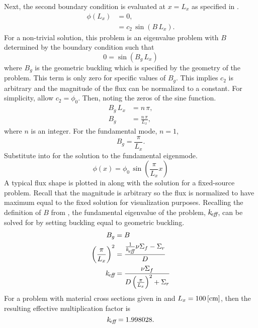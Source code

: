   Next, the second boundary condition is evaluated at $x=L_x$ as specified in
  .
  \begin{align}
    \phi(L_x) &= 0 ,\\
    &= c_2 \, \sin(B \, L_x).
  \end{align}
  For a non-trivial solution, this problem is an eigenvalue problem with $B$
  determined by the boundary condition such that 
  \begin{equation}
    0 = \sin(B_g \, L_x)
  \end{equation}
  where $B_g$ is the geometric buckling which is specified by the geometry of
  the problem. This term is only zero for specific values of $B_g$.
  This implies $c_2$ is arbitrary and the
  magnitude of the flux can be normalized to a constant. For simplicity, allow
  $c_2 = \phi_0$. Then, noting the zeros of the sine function.
  \begin{align}
    B_g \, L_x &= n \, \pi, \\
    B_g &= \frac{n \, \pi}{L_x},
  \end{align}
  where $n$ is an integer. For the fundamental mode, $n=1$,
  \begin{equation}
    \label{eq:1d1g_buckle_geom}
    B_g = \frac{\pi}{L_x}.
  \end{equation}
  Substitute  into  for the solution
  to the fundamental eigenmode.
  \begin{equation}
    \label{eq:analytic_1d1g}
    \phi(x) = \phi_0 \, \sin\left(\frac{\pi}{L_x} x \right)
  \end{equation}
  A typical flux shape is plotted in  along with the
  solution for a fixed-source problem. Recall that the magnitude is arbitrary so 
  the flux is normalized to have maximum equal to the fixed solution for 
  visualization purposes.
  Recalling the definition of $B$ from , the fundamental
  eigenvalue of the problem, $k_{\!\mbox{\scriptsize \em eff}}$, can be solved for by setting buckling
  equal to geometric buckling.
  \begin{align}
    B_g &= B \\
    \left( \frac{\pi}{L_x} \right)^2 &= 
      \frac{\frac{1}{k_{\!\mbox{\scriptsize \em eff}}} \nu \Sigma_f - \Sigma_r}{D} \\
    \label{eq:keff1d}
    k_{\!\mbox{\scriptsize \em eff}} &= \frac{\nu \Sigma_f}{D \left(\frac{\pi}{L_x}\right)^2 + \Sigma_r}
  \end{align}
  For a problem with material cross sections given in 
  and $L_x = 100 \left[\text{{cm}}\right]$, then the resulting effective multiplication factor
  is
  \begin{equation}
    k_{\!\mbox{\scriptsize \em eff}} = 1.998028.
  \end{equation}

